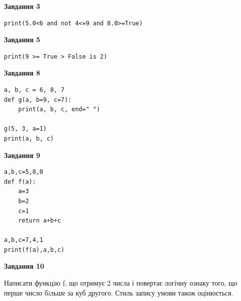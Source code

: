 \documentclass[12pt, ukrainian]{article}
\begin{document}
{\begin {large}
\begin{minipage}[t]{7.5cm}
\end{minipage}
\vline \hspace{6mm}
\begin{minipage}[t]{10.5cm}

\begin{center}
\textbf{Завдання 3}
\end{center}

\begin{verbatim}
print(5.0<6 and not 4<=9 and 8.0>=True)
\end{verbatim}



\begin{center}
\textbf{Завдання 5}
\end{center}

\begin{verbatim}
print(9 >= True > False is 2)
\end{verbatim}



\begin{center}
\textbf{Завдання 8}
\end{center}

\begin{verbatim}
a, b, c = 6, 8, 7
def g(a, b=9, c=7):
    print(a, b, c, end=" ")

g(5, 3, a=1)
print(a, b, c)
\end{verbatim}



\begin{center}
\textbf{Завдання 9}
\end{center}

\begin{verbatim}
a,b,c=5,8,0
def f(a):
    a=3
    b=2
    c=1
    return a+b+c

a,b,c=7,4,1
print(f(a),a,b,c)
\end{verbatim}



\begin{center}
\textbf{Завдання 10}
\end{center}

Написати функцiю f, що отримує 2 числа і повертає логічну ознаку того, що перше число бiльше за куб другого. Стиль запису умови також оцінюється.\par

\end{minipage}

\end {large}}
\newpage
\end{document}
